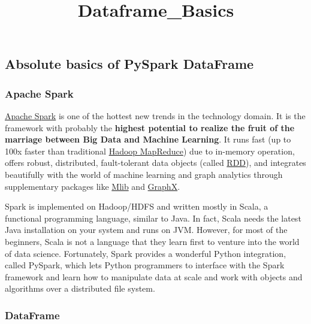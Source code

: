 \documentclass[11pt]{article}
\title{Dataframe\_Basics}
\begin{document}
    
    
    \maketitle
    
    

    
    \hypertarget{absolute-basics-of-pyspark-dataframe}{%
\subsection{Absolute basics of PySpark
DataFrame}\label{absolute-basics-of-pyspark-dataframe}}

\hypertarget{apache-spark}{%
\subsubsection{Apache Spark}\label{apache-spark}}

\href{https://spark.apache.org/}{Apache Spark} is one of the hottest new
trends in the technology domain. It is the framework with probably the
\textbf{highest potential to realize the fruit of the marriage between
Big Data and Machine Learning}. It runs fast (up to 100x faster than
traditional
\href{https://www.tutorialspoint.com/hadoop/hadoop_mapreduce.htm}{Hadoop
MapReduce}) due to in-memory operation, offers robust, distributed,
fault-tolerant data objects (called
\href{https://www.tutorialspoint.com/apache_spark/apache_spark_rdd.htm}{RDD}),
and integrates beautifully with the world of machine learning and graph
analytics through supplementary packages like
\href{https://spark.apache.org/mllib/}{Mlib} and
\href{https://spark.apache.org/graphx/}{GraphX}.

Spark is implemented on Hadoop/HDFS and written mostly in Scala, a
functional programming language, similar to Java. In fact, Scala needs
the latest Java installation on your system and runs on JVM. However,
for most of the beginners, Scala is not a language that they learn first
to venture into the world of data science. Fortunately, Spark provides a
wonderful Python integration, called PySpark, which lets Python
programmers to interface with the Spark framework and learn how to
manipulate data at scale and work with objects and algorithms over a
distributed file system.

\hypertarget{dataframe}{%
\subsubsection{DataFrame}\label{dataframe}}
\end{document}
